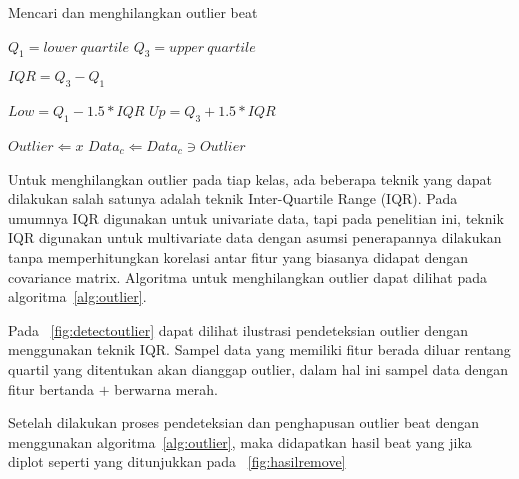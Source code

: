\begin{algorithm}
\scriptsize 
\caption{Mencari dan menghilangkan outlier beat}          
\label{alg:outlier}                           
\begin{algorithmic}                    %
			\STATE $Q_1 = lower\ quartile $  
			\STATE $Q_3 = upper\ quartile $ 
			
			\STATE
			\STATE $IQR = Q_3 - Q_1$ 
			
			\STATE
			\STATE {}
			\STATE $Low = Q_1 - 1.5 * IQR $ 
			\STATE $Up  = Q_3 + 1.5 * IQR $
			
			\STATE
			\STATE {}
				 	\STATE $Outlier \Leftarrow  x$ 
				\ENDIF
			\ENDFOR
		\ENDFOR
		\STATE $Data_c \Leftarrow Data_c \ni Outlier$
	\ENDFOR
\end{algorithmic}
\end{algorithm}

Untuk menghilangkan outlier pada tiap kelas, ada beberapa teknik yang dapat
dilakukan salah satunya adalah teknik Inter-Quartile Range (IQR). Pada umumnya
IQR digunakan untuk univariate data, tapi pada penelitian ini, teknik IQR
digunakan untuk multivariate data dengan asumsi penerapannya dilakukan tanpa
memperhitungkan korelasi antar fitur yang biasanya didapat dengan covariance
matrix. Algoritma untuk menghilangkan outlier dapat dilihat pada 
algoritma~\ref{alg:outlier}.


Pada \pic~\ref{fig:detectoutlier}  dapat dilihat ilustrasi pendeteksian outlier
dengan menggunakan teknik IQR. Sampel data yang memiliki fitur berada diluar
rentang quartil yang ditentukan akan dianggap outlier, dalam hal ini sampel data
dengan fitur bertanda $+$ berwarna merah.


Setelah dilakukan proses pendeteksian dan penghapusan outlier beat dengan
menggunakan algoritma~\ref{alg:outlier}, maka didapatkan hasil beat yang jika
diplot seperti yang ditunjukkan pada \pic~\ref{fig:hasilremove}

